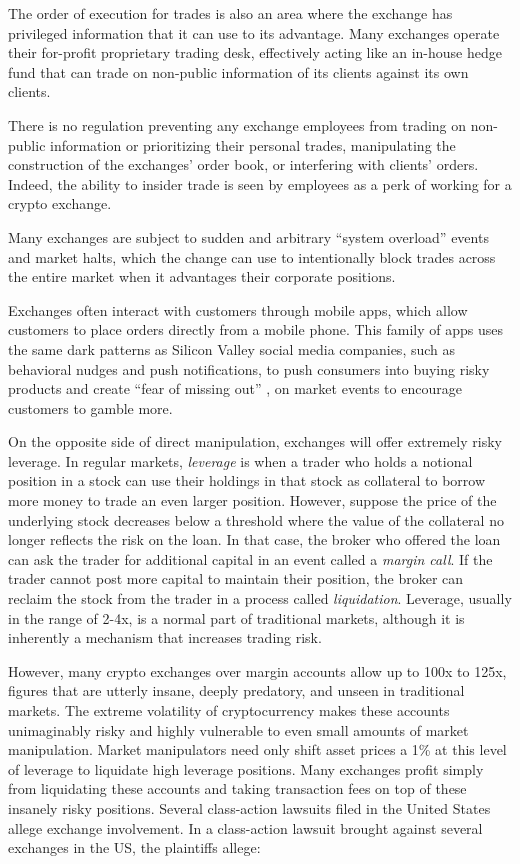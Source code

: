 The order of execution for trades is also an area where the exchange has
privileged information that it can use to its advantage. Many exchanges operate
their for-profit proprietary trading desk, effectively acting like an in-house
hedge fund that can trade on non-public information of its clients against its
own clients.

There is no regulation preventing any exchange employees from trading on
non-public information or prioritizing their personal trades, manipulating the
construction of the exchanges' order book, or interfering with clients' orders.
Indeed, the ability to insider trade is seen by employees as a perk of working
for a crypto exchange.

Many exchanges are subject to sudden and arbitrary ``system overload'' events and
market halts, which the change can use to intentionally block trades across the
entire market when it advantages their corporate positions.
\cite{ostroff_binance_2021}

Exchanges often interact with customers through mobile apps, which allow
customers to place orders directly from a mobile phone. This family of apps uses
the same dark patterns as Silicon Valley social media companies, such as
behavioral nudges and push notifications, to push consumers into buying risky
products and create ``fear of missing out'' \cite{lamba_fomo_2021}, on market
events to encourage customers to gamble more.


On the opposite side of direct manipulation, exchanges will offer extremely
risky leverage. In regular markets, \textit{leverage} is when a trader who holds
a notional position in a stock can use their holdings in that stock as
collateral to borrow more money to trade an even larger position. However,
suppose the price of the underlying stock decreases below a threshold where the
value of the collateral no longer reflects the risk on the loan. In that case,
the broker who offered the loan can ask the trader for additional capital in an
event called a \textit{margin call}. If the trader cannot post more capital to
maintain their position, the broker can reclaim the stock from the trader in a
process called \textit{liquidation}.  Leverage, usually in the range of 2-4x, is
a normal part of traditional markets, although it is inherently a mechanism that
increases trading risk.


However, many crypto exchanges over margin accounts allow up to 100x to 125x,
figures that are utterly insane, deeply predatory, and unseen in traditional
markets. The extreme volatility of cryptocurrency makes these accounts
unimaginably risky and highly vulnerable to even small amounts of market
manipulation. Market manipulators need only shift asset prices a 1\% at this
level of leverage to liquidate high leverage positions. Many exchanges profit
simply from liquidating these accounts and taking transaction fees on top of
these insanely risky positions. Several class-action lawsuits filed in the
United States allege exchange involvement. In a class-action lawsuit brought
against several exchanges in the US, the plaintiffs allege:

